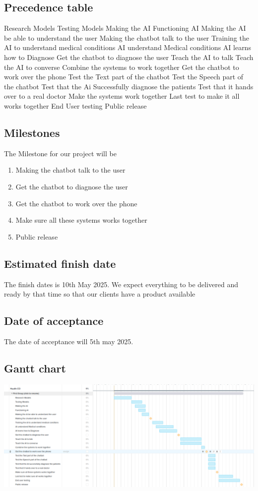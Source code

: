 \documentclass{article}
\begin{document}
\subsection{Precedence table}
Research Models
Testing Models
Making the AI
Functioning AI
Making the AI be able to understand the user
Making the chatbot talk to the user
Training the AI to understand medical conditions
AI understand Medical conditions
AI learns how to Diagnose
Get the chatbot to diagnose the user
Teach the AI to talk
Teach the AI to converse
Combine the systems to work together 
Get the chatbot to work over the phone
Test the Text part of the chatbot
Test the Speech part of the chatbot
Test that the Ai Successfully diagnose the patients
Test that it hands over to a real doctor
Make the systems work together
Last test to make it all works together
End User testing
Public release 


\subsection{Milestones}
The Milestone for our project will be 
	\begin{enumerate}
		\item Making the chatbot talk to the user
		\item Get the chatbot to diagnose the user
		\item Get the chatbot to work over the phone
		\item Make sure all these systems works together
		\item Public release
	\end{enumerate}

\subsection{Estimated finish date}

The finish dates is 10th May 2025. We expect everything to be delivered and ready by that time so that our clients have a product available 

\subsection{Date of acceptance}
The date of acceptance will 5th may 2025.  

\subsection{Gantt chart}
\includegraphics[scale=0.25]{gantt}
\end{document}
